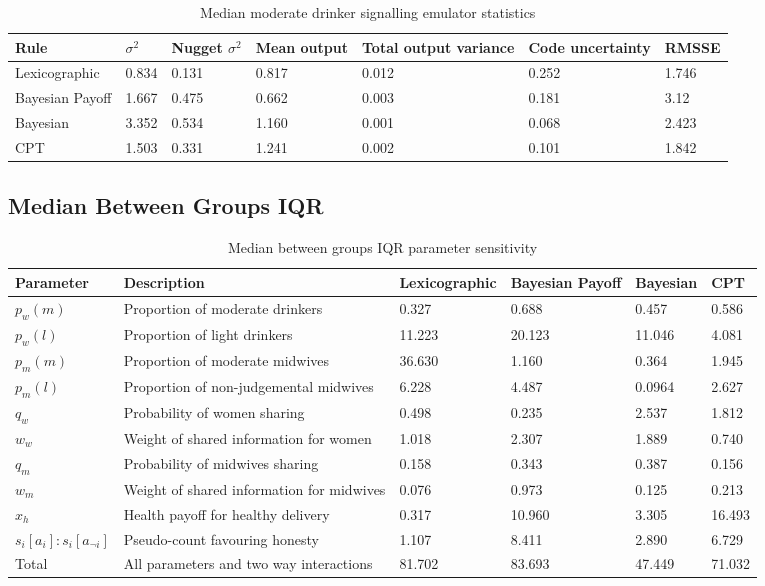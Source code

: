 \begin{table}[H]
\caption{Median moderate drinker signalling emulator statistics \label{tab:sa_emulator_sig}}
\begin{tabular} {jjjjjjj}
\hline
Rule & \(\sigma^2\) & Nugget \(\sigma^2\) & Mean output & Total output variance & Code uncertainty & RMSSE \\ \hline
Lexicographic & 0.834 & 0.131 &  0.817 & 0.012 & 0.252 & 1.746 \\ \hline
Bayesian Payoff & 1.667 & 0.475 &  0.662 & 0.003 & 0.181 & 3.12 \\ \hline
Bayesian & 3.352 & 0.534 & 1.160 & 0.001 & 0.068 & 2.423 \\ \hline
\ac{CPT} & 1.503 & 0.331 & 1.241 & 0.002 & 0.101 & 1.842 \\ \hline
\end{tabular}
\end{table}



\subsection{Median Between Groups IQR}

\begin{table}[H]
\caption{Median between groups IQR parameter sensitivity \label{tab:sa_results_iqr}}
\begin{tabular} {jjjjjj}
\hline
Parameter & Description & Lexicographic & Bayesian Payoff & Bayesian & \ac{CPT} \\ \hline
\(p_{w}(m)\) & Proportion of moderate drinkers & 0.327 & 0.688 & 0.457 & 0.586 \\ \hline
\(p_{w}(l)\) & Proportion of light drinkers & 11.223 & 20.123 & 11.046 & 4.081 \\ \hline
\(p_{m}(m)\) & Proportion of moderate midwives & 36.630 & 1.160 & 0.364 & 1.945 \\ \hline
\(p_{m}(l)\) & Proportion of non-judgemental midwives & 6.228 & 4.487 & 0.0964 & 2.627\\ \hline
\(q_{w}\) & Probability of women sharing & 0.498 & 0.235 & 2.537 & 1.812 \\ \hline
\(w_{w}\) & Weight of shared information for women & 1.018 & 2.307 & 1.889 & 0.740 \\ \hline
\(q_{m}\) & Probability of midwives sharing & 0.158 & 0.343 & 0.387 & 0.156 \\ \hline
\(w_{m}\) & Weight of shared information for midwives & 0.076 & 0.973 & 0.125 & 0.213 \\ \hline
\(x_{h}\) & Health payoff for healthy delivery & 0.317 & 10.960 & 3.305 & 16.493 \\ \hline
\(s_{i}[a_{i}]:s_{i}[a_{\neg i}]\) & Pseudo-count favouring honesty & 1.107 & 8.411 & 2.890 & 6.729 \\ \hline
Total & All parameters and two way interactions & 81.702 & 83.693 & 47.449 & 71.032 \\ \hline
\end{tabular}
\end{table}


